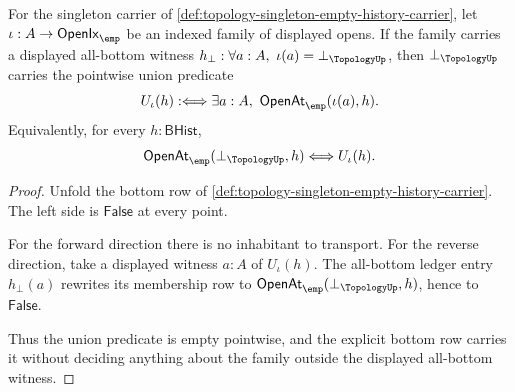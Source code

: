 \begin{theorem}
\label{thm:topology-singleton-union-bottom-exactness}
For the singleton carrier of \autoref{def:topology-singleton-empty-history-carrier}, let $\iota:A\to\mathsf{OpenIx}_{\emp}$ be an indexed family of displayed opens. If the family carries a displayed all-bottom witness $h_{\bot}:\forall a:A,\ \iota(a)=\bot_{\TopologyUp}$,
then $\bot_{\TopologyUp}$ carries the pointwise union predicate
$$
U_{\iota}(h):\Longleftrightarrow
\exists a:A,\ \mathsf{OpenAt}_{\emp}(\iota(a),h).
$$
Equivalently, for every $h:\mathsf{BHist}$,
$$
\mathsf{OpenAt}_{\emp}(\bot_{\TopologyUp},h)
\Longleftrightarrow
U_{\iota}(h).
$$
\end{theorem}
\begin{proof}
Unfold the bottom row of \autoref{def:topology-singleton-empty-history-carrier}. The left side is $\mathsf{False}$ at every point.

For the forward direction there is no inhabitant to transport. For the reverse direction, take a displayed witness $a:A$ of $U_{\iota}(h)$. The all-bottom ledger entry $h_{\bot}(a)$ rewrites its membership row to $\mathsf{OpenAt}_{\emp}(\bot_{\TopologyUp},h)$, hence to $\mathsf{False}$.

Thus the union predicate is empty pointwise, and the explicit bottom row carries it without deciding anything about the family outside the displayed all-bottom witness.
\end{proof}


